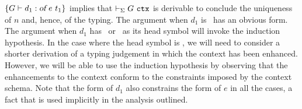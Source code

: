 $\left\{G \vdash d_1 : \mbox{\sl of}\  e\  t_1\right\}$ implies that $\vdash_{\Sigma} G\ \mbox{\tt ctx}$ is
derivable to conclude the uniqueness of $n$ and, hence, of the typing.
%
The argument when $d_1$ is \ofemptytm\ has an obvious form.
%
The argument when $d_1$ has \ofapptm\ or \oflamtm\ as its head symbol
will invoke the induction hypothesis. 
%
In the case where the head symbol is \oflamtm, we will need
to consider a shorter derivation of a typing judgement in which the
context has been enhanced.
%
However, we will be able to use the induction hypothesis by observing
that the enhancements to the context conform to the constraints
imposed by the context schema. 
%
Note that the form of $d_1$ also constrains the form of $e$ in all the
cases, a fact that is used implicitly in the analysis outlined.




